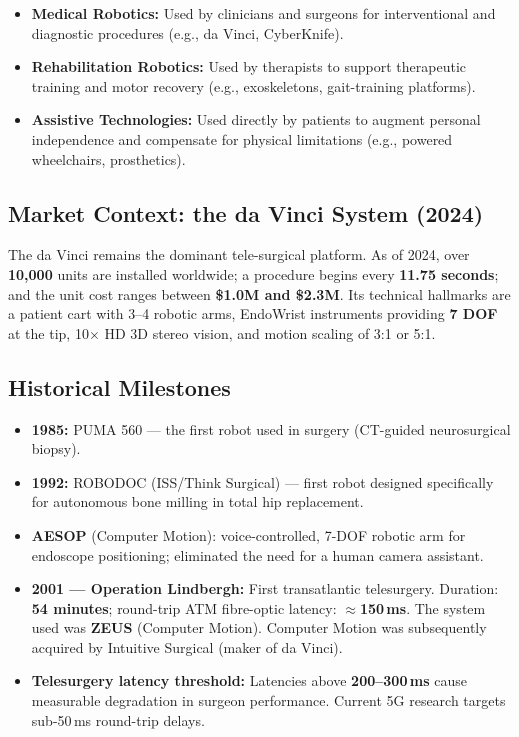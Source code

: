 \documentclass[11pt,a4paper,twoside]{report}
\begin{document}
\begin{itemize}
    \item \textbf{Medical Robotics:} Used by clinicians and surgeons for interventional and diagnostic procedures (e.g., da Vinci, CyberKnife).
    \item \textbf{Rehabilitation Robotics:} Used by therapists to support therapeutic training and motor recovery (e.g., exoskeletons, gait-training platforms).
    \item \textbf{Assistive Technologies:} Used directly by patients to augment personal independence and compensate for physical limitations (e.g., powered wheelchairs, prosthetics).
\end{itemize}

\subsection{Market Context: the da Vinci System (2024)}
The da Vinci remains the dominant tele-surgical platform. As of 2024, over \textbf{10,000} units are installed worldwide; a procedure begins every \textbf{11.75 seconds}; and the unit cost ranges between \textbf{\$1.0M and \$2.3M}. Its technical hallmarks are a patient cart with 3--4 robotic arms, EndoWrist instruments providing \textbf{7 DOF} at the tip, 10$\times$ HD 3D stereo vision, and motion scaling of 3:1 or 5:1.

\subsection{Historical Milestones}
\begin{itemize}
    \item \textbf{1985:} PUMA 560 — the first robot used in surgery (CT-guided neurosurgical biopsy).
    \item \textbf{1992:} ROBODOC (ISS/Think Surgical) — first robot designed specifically for autonomous bone milling in total hip replacement.
    \item \textbf{AESOP} (Computer Motion): voice-controlled, 7-DOF robotic arm for endoscope positioning; eliminated the need for a human camera assistant.
    \item \textbf{2001 — Operation Lindbergh:} First transatlantic telesurgery. Duration: \textbf{54 minutes}; round-trip ATM fibre-optic latency: $\approx$\textbf{150\,ms}. The system used was \textbf{ZEUS} (Computer Motion). Computer Motion was subsequently acquired by Intuitive Surgical (maker of da Vinci).
    \item \textbf{Telesurgery latency threshold:} Latencies above \textbf{200--300\,ms} cause measurable degradation in surgeon performance. Current 5G research targets sub-50\,ms round-trip delays.
\end{itemize}
\end{document}
